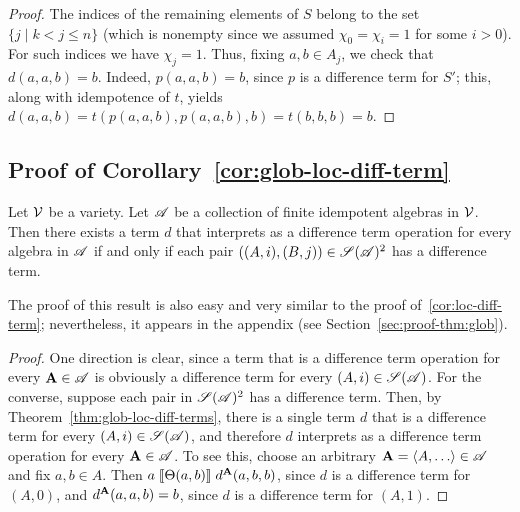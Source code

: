 \begin{proof}
The indices of the remaining elements of $S$
belong to the set $\{j \mid k<j\leq n\}$ (which is nonempty since we
assumed $\chi_0 = \chi_i = 1$ for some $i>0$).
For such indices we have $\chi_j = 1$.
Thus, fixing $a, b \in A_j$, we check that $d(a,a,b) = b$.
Indeed, $p(a,a,b) = b$, since $p$ is a \glocal difference term for $S'$; 
this, along with idempotence of $t$, yields
$d(a,a,b) =t(p(a,a,b), p(a,a,b), b)=t(b, b, b) =b$.
\end{proof}

\subsection{Proof of Corollary~\ref{cor:glob-loc-diff-term}}
\label{sec:proof-cor:glob}
\begin{corollary}[\ref{cor:glob-loc-diff-term}]
  Let $\mathcal{V}$ be a variety.  Let $\mathscr{A}$ be a collection of finite idempotent
  algebras in $\mathcal{V}$. %
  Then there exists a term $d$ that interprets as a difference term operation
  for every algebra in $\mathscr{A}$
  if and only if each pair $((A,i), (B,j)) \in \mathscr{S}(\mathscr{A})^2$ has a \glocal
  difference term.
\end{corollary}
The proof of this result is also easy and very similar to the proof
of~\ref{cor:loc-diff-term}; nevertheless, it appears in the appendix
(see Section~\ref{sec:proof-thm:glob}).
\begin{proof}
  One direction is clear, since a term that is a difference term operation for
  every $\mathbf{A} \in \mathscr{A}$ is obviously a \glocal difference term for
  every $(A, i) \in \mathscr{S}(\mathscr{A})$.
  For the converse, suppose
  each pair in $\mathscr{S}(\mathscr{A})^2$ has a \glocal
  difference term. Then, by Theorem~\ref{thm:glob-loc-diff-terms},
  there is a single term $d$ that is a \glocal difference term for every 
  $(A, i) \in \mathscr{S}(\mathscr{A})$, 
  and therefore $d$ interprets as a difference term operation for every $\mathbf{A} \in \mathscr{A}$.
  To see this, choose an arbitrary $\bA = \<A, \dots\> \in \scA$ and fix $a, b \in A$. 
  Then $a \mathrel{\llbracket \Theta(a,b) \rrbracket} d^{\mathbf{A}}(a,b,b)$,
  since $d$ is a \glocal difference term for $(A,0)$,
  and $d^{\mathbf{A}}(a,a,b) = b$, since $d$ is a \glocal
  difference term for $(A,1)$. 
\end{proof}





